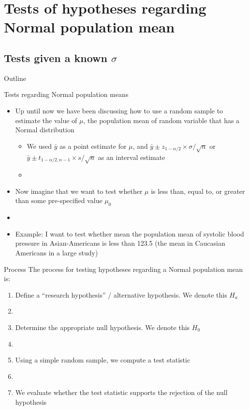 \documentclass[xcolor=dvipsnames]{beamer}
\begin{document}
\section{Tests of hypotheses regarding Normal population mean}

\subsection{Tests given a known $\sigma$}
\begin{frame}{Outline}
	\tableofcontents[currentsection,subsectionstyle=show/shaded/hide]
\end{frame}

\begin{frame}{Tests regarding Normal population means}
	\begin{itemize}
		\item Up until now we have been discussing how to use a random sample to estimate the value of $\mu$, the population mean of random variable that has a Normal distribution
		\begin{itemize}
			\item We used $\bar{y}$ as a point estimate for $\mu$, and $\bar{y} \pm z_{1-\alpha / 2} \times \sigma / \sqrt{n}$ or $\bar{y} \pm t_{1-\alpha / 2, n - 1} \times s / \sqrt{n}$ as an interval estimate
			\item[]
		\end{itemize}
	\item Now imagine that we want to test whether $\mu$ is less than, equal to, or greater than some pre-specified value $\mu_0$
	\item[]
	\item Example: I want to test whether mean the population mean of systolic blood pressure in Asian-Americans is less than 123.5 (the mean in Caucasian Americans in a large study)
	
	\end{itemize}
\end{frame}

\begin{frame}{Process}
	The process for testing hypotheses regarding a Normal population mean is: 
	\begin{enumerate}
		\item Define a ``research hypothesis'' / alternative hypothesis. We denote this $H_a$
		\item[]
		\item Determine the appropriate null hypothesis. We denote this $H_0$
		\item[]
		\item Using a simple random sample, we compute a test statistic
		\item[]
		\item We evaluate whether the test statistic supports the rejection of the null hypothesis
	\end{enumerate}
\end{frame}
\end{document}
